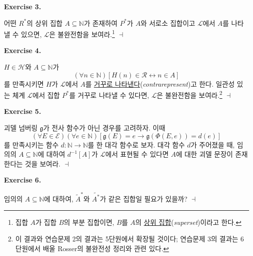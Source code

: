 \documentclass[12pt]{paper}
\newcommand{\gnum}
{ \mathfrak{g} }
\newenvironment{context}[1][]
{ \noindent \textbf{{#1}.}
}
{ \hfill $ \dashv $ }
\begin{document}
\begin{context}[Exercise 3]
어떤 $R^{*}$의 상위 집합 $A \subseteq \mathbb{N}$가 존재하여 $P^{*}$가 $A$와 서로소 집합이고 $\mathcal{L}$에서 $A$를 나타낼 수 있으면,
$\mathcal{L}$은 불완전함을 보여라.\footnote
{
집합 $A$가 집합 $B$의 부분 집합이면, $B$를 $A$의 \underline{상위 집합}(\textit{superset})이라고 한다.
}
\end{context}

\begin{context}[Exercise 4]
$H \in \mathcal{H}$와 $A \subseteq \mathbb{N}$가
$$ \left( \forall n \in \mathbb{N} \right) \left[ H \left( n \right) \in \mathcal{R} \leftrightarrow n \in A \right] $$를 만족시키면
$H$가 $\mathcal{L}$에서 $A$를 \underline{거꾸로 나타낸다}(\textit{contrarepresent})고 한다.
일관성 있는 체계 $\mathcal{L}$에서 집합 $P^{*}$를 거꾸로 나타낼 수 있다면,
$\mathcal{L}$은 불완전함을 보여라.\footnote
{
이 결과와 연습문제 2의 결과는 5단원에서 확장될 것이다;
연습문제 3의 결과는 6단원에서 배울 Rosser의 불완전성 정리와 관련 있다.
}
\end{context}

\begin{context}[Exercise 5]
괴델 넘버링 $\gnum$가 전사 함수가 아닌 경우를 고려하자.
이때 $$ \left( \forall E \in \mathcal{E} \right) \left( \forall e \in \mathbb{N} \right) \left[ \gnum \left( E \right) = e \rightarrow \gnum \left( \Phi \left( E , e \right) \right) = d \left( e \right) \right] $$를
만족시키는 함수 $d : \mathbb{N} \to \mathbb{N}$를 한 대각 함수로 보자.
대각 함수 $d$가 주어졌을 때, 임의의 $A \subseteq \mathbb{N}$에 대하여 $d^{-1} \left[ A \right]$가 $\mathcal{L}$에서 표현될 수 있다면 $A$에 대한 괴델 문장이 존재한다는 것을 보여라.
\end{context}

\begin{context}[Exercise 6]
임의의 $A \subseteq \mathbb{N}$에 대하여,
$\widetilde{A}^{*}$와 $\widetilde{A^{*}}$가 같은 집합일 필요가 있을까?
\end{context}
\end{document}
